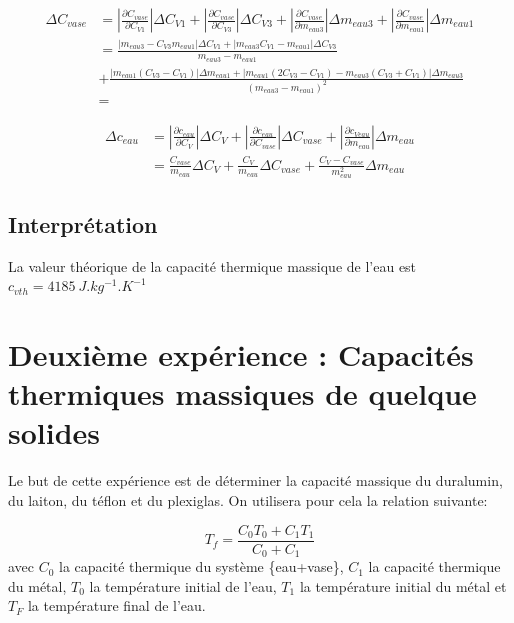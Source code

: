 \documentclass[12pt]{article}
\begin{document}
\begin{align*}
\Delta C_{vase} &= \displaystyle\left\lvert \frac{\partial C_{vase}}{\partial C_{V1}}\right\rvert \Delta C_{V1}+ \displaystyle\left\lvert \frac{\partial C_{vase}}{\partial C_{V3}}\right\rvert \Delta C_{V3} +\displaystyle\left\lvert \frac{\partial C_{vase}}{\partial m_{eau3}}\right\rvert \Delta m_{eau3} + \displaystyle\left\lvert \frac{\partial C_{vase}}{\partial m_{eau1}}\right\rvert \Delta m_{eau1} \\
&= \frac{\displaystyle\left\lvert m_{eau3}-C_{V3}m_{eau1}\right\rvert \Delta C_{V1} + \displaystyle\left\lvert m_{eau3}C_{V1}-m_{eau1}\right\rvert \Delta C_{V3}}{m_{eau3}-m_{eau1}}\\
&+ \frac{\displaystyle\left\lvert m_{eau1}(C_{V3}-C_{V1})\right\rvert \Delta m_{eau1}+\displaystyle\left\lvert m_{eau1}(2C_{V3}-C_{V1})-m_{eau3}(C_{V3}+C_{V1})\right\rvert \Delta m_{eau3} }{(m_{eau3}-m_{eau1})^2} \\
&=
\end{align*}

\begin{align*}
\Delta c_{eau} &= \displaystyle\left\lvert \frac{\partial c_{eau}}{\partial C_{V}}\right\rvert \Delta C_{V} + \displaystyle\left\lvert \frac{\partial c_{eau}}{\partial C_{vase}}\right\rvert \Delta C_{vase} + \displaystyle\left\lvert  \frac{\partial c_{Veau}}{\partial m_{eau}}\right\rvert \Delta m_{eau} \\
	&=	\frac{C_{vase}}{m_{eau}}\Delta C_{V} + \frac{C_{V}}{m_{eau}}\Delta C_{vase} + \frac{C_{V}-C_{vase}}{m_{eau}^2}\Delta m_{eau}
\end{align*}


\subsection{Interprétation}

La valeur théorique de la capacité thermique massique de l'eau est $c_{vth }=4185 ~ J.kg^{-1}.K^{-1}$

\newpage
\section{Deuxième expérience : Capacités thermiques massiques de quelque solides}

Le but de cette expérience est de déterminer la capacité massique du duralumin, du laiton, du téflon et du plexiglas. On utilisera pour cela la relation suivante:

\begin{equation}
	T_f=\frac{C_0T_0+C_1T_1}{C_0+C_1}
\label{EquationTf}
\end{equation}
avec $C_0$ la capacité thermique du système \{eau+vase\}, $C_1$ la capacité thermique du métal, $T_0$ la température initial de l'eau, $T_1$ la température initial du métal et $T_F$ la température final de l'eau.
\end{document}
